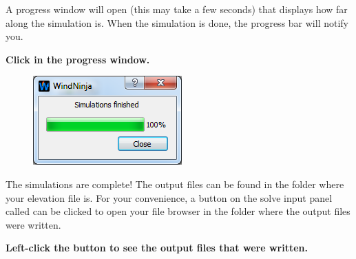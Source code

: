 \documentclass[12pt]{article}
\begin{document}
A progress window will open (this may take a few seconds) that displays how far along the simulation is.  When the simulation is done, the progress bar will notify you.

\textbf{\color{red} Click  in the progress window.}

\begin{figure}[H]
	\label{}
	\centering
	\includegraphics[scale=1.0]{sim_finished_1}
\end{figure}

The simulations are complete!  The output files can be found in the folder where your elevation file is.  For your convenience, a button on the solve input panel called  can be clicked to open your file browser in the folder where the output files were written.

\textbf{\color{red} Left-click the  button to see the output files that were written.}
\end{document}
